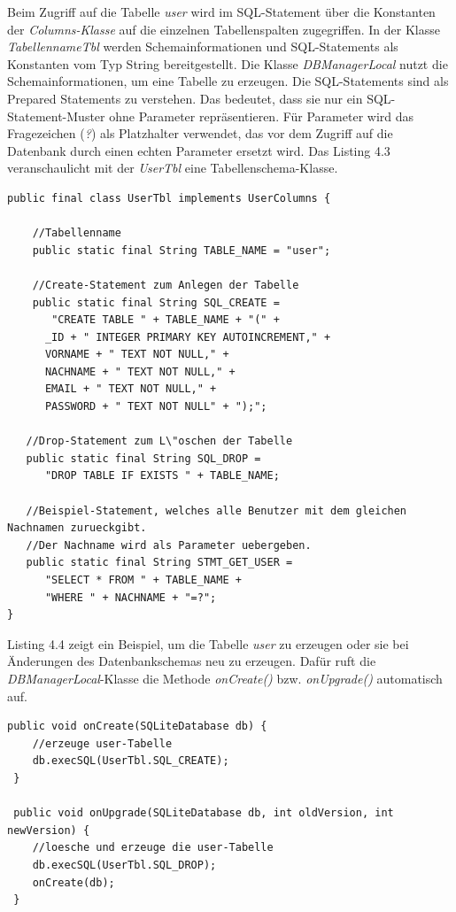 Beim Zugriff auf die Tabelle \emph{user} wird im SQL-Statement \"uber die Konstanten der \emph{Columns-Klasse} auf die 
einzelnen Tabellenspalten zugegriffen.
In der Klasse \emph{TabellennameTbl} werden Schemainformationen und SQL-Statements als Konstanten vom Typ String bereitgestellt.
Die Klasse \emph{DBManagerLocal} nutzt die Schemainformationen, um eine Tabelle zu erzeugen.
Die SQL-Statements sind als Prepared Statements zu verstehen.
Das bedeutet, dass sie nur ein SQL-Statement-Muster ohne Parameter repr\"asentieren.
F\"ur Parameter wird das Fragezeichen (\emph{?}) als Platzhalter verwendet, 
das vor dem Zugriff auf die Datenbank durch einen echten Parameter ersetzt wird.
Das Listing 4.3 veranschaulicht mit der \emph{UserTbl} eine Tabellenschema-Klasse.\\

\begin{lstlisting}[caption={Die Klasse \emph{UserTbl}}]
 public final class UserTbl implements UserColumns {
 
    //Tabellenname
    public static final String TABLE_NAME = "user";
    
    //Create-Statement zum Anlegen der Tabelle
    public static final String SQL_CREATE = 
       "CREATE TABLE " + TABLE_NAME + "(" + 
      _ID + " INTEGER PRIMARY KEY AUTOINCREMENT," + 
      VORNAME + " TEXT NOT NULL," + 
      NACHNAME + " TEXT NOT NULL," + 
      EMAIL + " TEXT NOT NULL," + 
      PASSWORD + " TEXT NOT NULL" + ");";
      
   //Drop-Statement zum L\"oschen der Tabelle
   public static final String SQL_DROP = 
      "DROP TABLE IF EXISTS " + TABLE_NAME;
      
   //Beispiel-Statement, welches alle Benutzer mit dem gleichen Nachnamen zurueckgibt.
   //Der Nachname wird als Parameter uebergeben.
   public static final String STMT_GET_USER = 
      "SELECT * FROM " + TABLE_NAME + 
      "WHERE " + NACHNAME + "=?";
}
\end{lstlisting}

Listing 4.4 zeigt ein Beispiel, um die Tabelle \emph{user} zu erzeugen oder sie bei \"Anderungen des Datenbankschemas neu zu erzeugen.
Daf\"ur ruft die \emph{DBManagerLocal}-Klasse die Methode \emph{onCreate()} bzw. \emph{onUpgrade()} automatisch auf.\\

\begin{lstlisting}[caption={\emph{DBManagerLocal} erzeugt die Tabelle \emph{user}}]
 public void onCreate(SQLiteDatabase db) {  
    //erzeuge user-Tabelle
    db.execSQL(UserTbl.SQL_CREATE);
 }
    
 public void onUpgrade(SQLiteDatabase db, int oldVersion, int newVersion) {
    //loesche und erzeuge die user-Tabelle
    db.execSQL(UserTbl.SQL_DROP);
    onCreate(db);
 }
\end{lstlisting}

